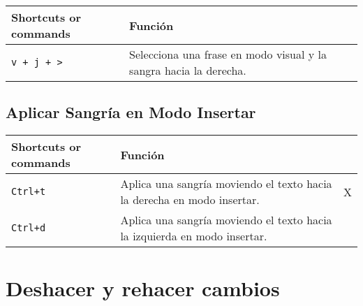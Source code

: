 \documentclass[
  doc,
  floatsintext,
  longtable,
  a4paper,
  nolmodern,
  notxfonts,
  notimes,
  colorlinks=true,linkcolor=blue,citecolor=blue,urlcolor=blue]{apa7}
\begin{document}
\begin{longtable}[]{@{}
  >{\raggedright\arraybackslash}p{}
  >{\raggedright\arraybackslash}p{}@{}}
\toprule\noalign{}
\begin{minipage}[b]{\linewidth}\raggedright
Shortcuts or commands
\end{minipage} & \begin{minipage}[b]{\linewidth}\raggedright
Función
\end{minipage} \\
\midrule\noalign{}
\endhead
\bottomrule\noalign{}
\endlastfoot
\texttt{v\ +\ j\ +\ \textgreater{}} & Selecciona una frase en modo
visual y la sangra hacia la derecha. \\
\end{longtable}

\subsection{Aplicar Sangría en Modo
Insertar}\label{aplicar-sangruxeda-en-modo-insertar}

\begin{longtable}[]{@{}
  >{\raggedright\arraybackslash}p{}
  >{\raggedright\arraybackslash}p{}
  >{\raggedright\arraybackslash}p{}@{}}
\toprule\noalign{}
\begin{minipage}[b]{\linewidth}\raggedright
Shortcuts or commands
\end{minipage} & \begin{minipage}[b]{\linewidth}\raggedright
Función
\end{minipage} & \begin{minipage}[b]{\linewidth}\raggedright
\end{minipage} \\
\midrule\noalign{}
\endhead
\bottomrule\noalign{}
\endlastfoot
\texttt{Ctrl+t} & Aplica una sangría moviendo el texto hacia la derecha
en modo insertar. & X \\
\texttt{Ctrl+d} & Aplica una sangría moviendo el texto hacia la
izquierda en modo insertar. & \\
\end{longtable}

\section{Deshacer y rehacer cambios}\label{deshacer-y-rehacer-cambios}
\end{document}
